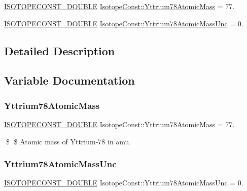 \begin{DoxyCompactItemize}
\item 
\mbox{\hyperlink{group___isotope_const-_macros_ga8f45a7272ce02c0b4c65c44636ed719a}{I\+S\+O\+T\+O\+P\+E\+C\+O\+N\+S\+T\+\_\+\+D\+O\+U\+B\+LE}} \mbox{\hyperlink{group___isotope_const-_yttrium-_y78_ga37ab7d1ad0a3af16025b20b8726d8f8d}{Isotope\+Const\+::\+Yttrium78\+Atomic\+Mass}} = 77.
\item 
\mbox{\hyperlink{group___isotope_const-_macros_ga8f45a7272ce02c0b4c65c44636ed719a}{I\+S\+O\+T\+O\+P\+E\+C\+O\+N\+S\+T\+\_\+\+D\+O\+U\+B\+LE}} \mbox{\hyperlink{group___isotope_const-_yttrium-_y78_gaf1222524532354baebf4a63f57a5f88b}{Isotope\+Const\+::\+Yttrium78\+Atomic\+Mass\+Unc}} = 0.
\end{DoxyCompactItemize}


\subsection{Detailed Description}


\subsection{Variable Documentation}
\mbox{\label{group___isotope_const-_yttrium-_y78_ga37ab7d1ad0a3af16025b20b8726d8f8d}} 
\subsubsection{\texorpdfstring{Yttrium78\+Atomic\+Mass}{Yttrium78AtomicMass}}
{\footnotesize\ttfamily \mbox{\hyperlink{group___isotope_const-_macros_ga8f45a7272ce02c0b4c65c44636ed719a}{I\+S\+O\+T\+O\+P\+E\+C\+O\+N\+S\+T\+\_\+\+D\+O\+U\+B\+LE}} Isotope\+Const\+::\+Yttrium78\+Atomic\+Mass = 77.}

\$ \$ Atomic mass of Yttrium-\/78 in amu. \mbox{\label{group___isotope_const-_yttrium-_y78_gaf1222524532354baebf4a63f57a5f88b}} 
\subsubsection{\texorpdfstring{Yttrium78\+Atomic\+Mass\+Unc}{Yttrium78AtomicMassUnc}}
{\footnotesize\ttfamily \mbox{\hyperlink{group___isotope_const-_macros_ga8f45a7272ce02c0b4c65c44636ed719a}{I\+S\+O\+T\+O\+P\+E\+C\+O\+N\+S\+T\+\_\+\+D\+O\+U\+B\+LE}} Isotope\+Const\+::\+Yttrium78\+Atomic\+Mass\+Unc = 0.}

